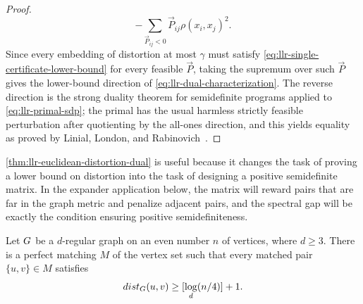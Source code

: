 \begin{proof}
\begin{equation}
		{-\sum_{\vec{P}_{ij}<0}\vec{P}_{ij}\rho(x_i,x_j)^2}.
	\end{equation}
	Since every embedding of distortion at most \(\gamma\) must satisfy \cref{eq:llr-single-certificate-lower-bound} for every feasible \(\vec{P}\), taking the supremum over such \(\vec{P}\) gives the lower-bound direction of \cref{eq:llr-dual-characterization}. The reverse direction is the strong duality theorem for semidefinite programs applied to \cref{eq:llr-primal-sdp}; the primal has the usual harmless strictly feasible perturbation after quotienting by the all-ones direction, and this yields equality as proved by Linial, London, and Rabinovich~\cite{LLR1995}.
\end{proof}

\cref{thm:llr-euclidean-distortion-dual} is useful because it changes the task of proving a lower bound on distortion into the task of designing a positive semidefinite matrix. In the expander application below, the matrix will reward pairs that are far in the graph metric and penalize adjacent pairs, and the spectral gap will be exactly the condition ensuring positive semidefiniteness.

\begin{lemma}
	\label{lem:far-perfect-matching}
	Let \(G\) be a \(d\)-regular graph on an even number \(n\) of vertices, where \(d\geq 3\). There is a perfect matching \(M\) of the vertex set such that every matched pair \(\{u,v\}\in M\) satisfies
	\begin{equation}
		\label{eq:far-matching-distance-lower-bound}
		\operatorname{dist}_\Graph(u,v)\geq \left\lfloor \log_d(n/4)\right\rfloor+1.
	\end{equation}
\end{lemma}


